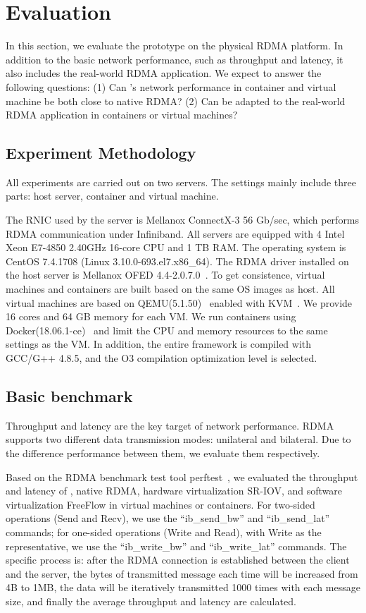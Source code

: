 \section{Evaluation} \label{eval}
In this section, we evaluate the \sys prototype on the physical RDMA platform. In addition to the basic network performance, such as throughput and latency, it also includes the real-world RDMA application. We expect to answer the following questions:
(1) Can \sys's network performance in container and virtual machine be both close to native RDMA?
(2) Can \sys be adapted to the real-world RDMA application in containers or virtual machines?

\subsection{Experiment Methodology}
All experiments are carried out on two servers. The settings mainly include three parts: host server, container and virtual machine. 

The RNIC used by the server is Mellanox ConnectX-3 56 Gb/sec, which performs RDMA communication under Infiniband. All servers are equipped with 4 Intel Xeon E7-4850 2.40GHz 16-core CPU and 1 TB RAM. The operating system is CentOS 7.4.1708 (Linux 3.10.0-693.el7.x86\_64). The RDMA driver installed on the host server is Mellanox OFED 4.4-2.0.7.0~\cite{mlnx-ofed}. To get consistence, virtual machines and containers are built based on the same OS images as host. All virtual machines are based on QEMU(5.1.50)~\cite{qemu} enabled with KVM~\cite{kvm}. We provide 16 cores and 64 GB memory for each VM. We run containers using Docker(18.06.1-ce)~\cite{docker} and limit the CPU and memory resources to the same settings as the VM. In addition, the entire \sys framework is compiled with GCC/G++ 4.8.5, and the O3 compilation optimization level is selected. 

\subsection{Basic benchmark}
Throughput and latency are the key target of network performance. RDMA supports two different data transmission modes: unilateral and bilateral. Due to the difference performance between them, we evaluate them respectively.

Based on the RDMA benchmark test tool perftest~\cite{perftest}, we evaluated the throughput and latency of \sys, native RDMA, hardware virtualization SR-IOV, and software virtualization FreeFlow in virtual machines or containers. For two-sided operations (Send and Recv), we use the ``ib\_send\_bw'' and ``ib\_send\_lat'' commands; for one-sided operations (Write and Read), with Write as the representative, we use the ``ib\_write\_bw'' and ``ib\_write\_lat'' commands. The specific process is: after the RDMA connection is established between the client and the server, the bytes of transmitted message each time will be increased from 4B to 1MB, the data will be iteratively transmitted 1000 times with each message size, and finally the average throughput and latency are calculated.

